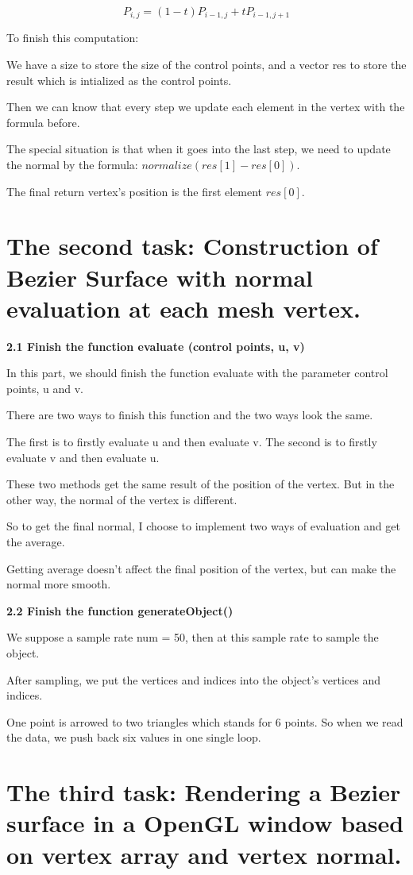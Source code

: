 \documentclass[acmtog]{acmart}
\begin{document}
$$P_{i,j}=(1-t)P_{i-1,j}+tP_{i-1,j+1}$$

To finish this computation:

We have a size to store the size of the control points, and a vector res to store the result which is intialized as the control points.

Then we can know that every step we update each element in the vertex with the formula before.

The special situation is that when it goes into the last step, we need to update the normal by the formula: $normalize(res[1]-res[0])$.

The final return vertex's position is the first element $res[0]$.

\section{The second task: Construction of Bezier Surface with normal evaluation at each mesh vertex.}

\textbf{2.1 Finish the function evaluate (control points, u, v)}

In this part, we should finish the function evaluate with the parameter control points, u and v.

There are two ways to finish this function and the two ways look the same.

The first is to firstly evaluate u and then evaluate v. The second is to firstly evaluate v and then evaluate u.

These two methods get the same result of the position of the vertex. But in the other way, the normal of the vertex is different.

So to get the final normal, I choose to implement two ways of evaluation and get the average.

Getting average doesn't affect the final position of the vertex, but can make the normal more smooth.

\textbf{2.2 Finish the function generateObject()}

We suppose a sample rate num = 50, then at this sample rate to sample the object.

After sampling, we put the vertices and indices into the object's vertices and indices.

One point is arrowed to two triangles which stands for 6 points. So when we read the data, we push back six values in one single loop.

\section{ The third task: Rendering a Bezier surface in a OpenGL window based on vertex array and vertex normal.}
\end{document}
